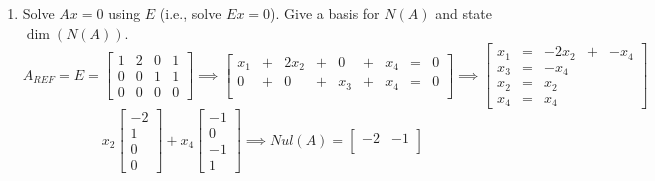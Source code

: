 \documentclass[9pt]{article}
\theoremstyle{plain}
\begin{document}
\begin{enumerate}
	      \[
		      \text{ Basis of $Row(A)$} =
		      \left\{
		      \begin{bmatrix} 1 \\ 2 \\ 1 \end{bmatrix}^T
		      \begin{bmatrix} 0 \\ 1 \\ 1 \end{bmatrix}^T
		      \right\}
	      \]
	      \[ dims(Col(A)) = dims(Row(A)) = [dims(A) - dims(Nul(A))] \]
	\item[(d)] Solve $Ax=0$ using $E$ (i.e., solve $Ex=0$). Give a basis for $N(A)$ and state $\dim(N(A))$.
	      \[
		      A_{REF} = E =
		      \left[
			      \begin{array}{cccc}
				      1 & 2 & 0 & 1 \\
				      0 & 0 & 1 & 1 \\
				      0 & 0 & 0 & 0
			      \end{array}
			      \right]
		      \implies
		      \left[
			      \begin{array}{cccccccccc}
				      x_1 & + & 2x_2 & + & 0   & + & x_4 & = & 0 \\
				      0   & + & 0    & + & x_3 & + & x_4 & = & 0 \\
			      \end{array}
			      \right]
		      \implies
		      \left[
			      \begin{array}{cccccccc}
				      x_1 & = & -2x_2 & + & -x_4 \\
				      x_3 & = & -x_4             \\
				      x_2 & = & x_2              \\
				      x_4 & = & x_4
			      \end{array}
			      \right]
	      \]
	      \[
		      x_2 \begin{bmatrix} -2 \\ 1 \\ 0 \\ 0 \end{bmatrix} +
		      x_4 \begin{bmatrix} -1 \\ 0 \\ -1 \\ 1 \end{bmatrix}
		      \implies
		      Nul(A) =
		      \begin{bmatrix}
			      -2 & -1 \\

\end{bmatrix}\]
\end{enumerate}
\end{document}
